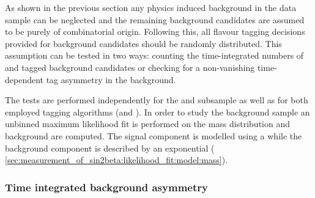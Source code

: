 As shown in the previous section any physics induced background in the data
sample can be neglected and the remaining background candidates are assumed to
be purely of combinatorial origin. Following this, all flavour tagging decisions
provided for background candidates should be randomly distributed. This
assumption can be tested in two ways: counting the time-integrated numbers of
\Bd and \Bdbar tagged background candidates or checking for a non-vanishing
time-dependent tag asymmetry in the background.

The tests are performed independently for the \catDD and \catLL subsample as
well as for both employed tagging algorithms (\OS and \SSpi). In order to study
the background sample an unbinned maximum likelihood fit is performed on the \Bd
mass distribution and background \sWeights \cite{Pivk:2004ty} are computed. The
signal component is modelled using a \Ipatia \PDF while the background component
is described by an exponential \PDF (\cf
\cref{sec:measurement_of_sin2beta:likelihood_fit:model:mass}).

\subsubsection{Time integrated background asymmetry}
\label{sec:measurement_of_sin2beta:physic_backgrounds:tagging_asymmetries:time_integrated}

